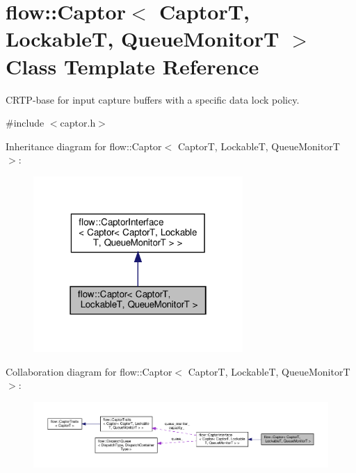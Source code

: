 \hypertarget{classflow_1_1_captor}{}\section{flow\+:\+:Captor$<$ CaptorT, LockableT, Queue\+MonitorT $>$ Class Template Reference}
\label{classflow_1_1_captor}


C\+R\+T\+P-\/base for input capture buffers with a specific data lock policy.  




{\ttfamily \#include $<$captor.\+h$>$}



Inheritance diagram for flow\+:\+:Captor$<$ CaptorT, LockableT, Queue\+MonitorT $>$\+:
\nopagebreak
\begin{figure}[H]
\begin{center}
\leavevmode
\includegraphics[width=226pt]{classflow_1_1_captor__inherit__graph}
\end{center}
\end{figure}


Collaboration diagram for flow\+:\+:Captor$<$ CaptorT, LockableT, Queue\+MonitorT $>$\+:
\nopagebreak
\begin{figure}[H]
\begin{center}
\leavevmode
\includegraphics[width=350pt]{classflow_1_1_captor__coll__graph}
\end{center}
\end{figure}
